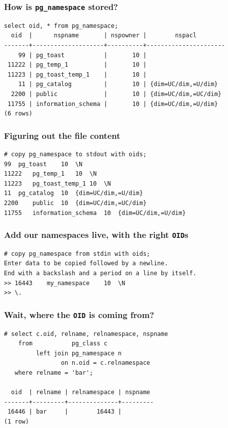 \documentclass{beamer}
\begin{document}
\begin{frame}[fragile]
  \frametitle{How is \texttt{pg\_namespace} stored?}
  
  \begin{verbatim}
select oid, * from pg_namespace;
  oid  |      nspname       | nspowner |        nspacl        
-------+--------------------+----------+----------------------
    99 | pg_toast           |       10 | 
 11222 | pg_temp_1          |       10 | 
 11223 | pg_toast_temp_1    |       10 | 
    11 | pg_catalog         |       10 | {dim=UC/dim,=U/dim}
  2200 | public             |       10 | {dim=UC/dim,=UC/dim}
 11755 | information_schema |       10 | {dim=UC/dim,=U/dim}
(6 rows)
  \end{verbatim}
\end{frame}

\begin{frame}[fragile=singleslide]
  \frametitle{Figuring out the file content}
  
  \begin{verbatim}
# copy pg_namespace to stdout with oids;
99	pg_toast	10	\N
11222	pg_temp_1	10	\N
11223	pg_toast_temp_1	10	\N
11	pg_catalog	10	{dim=UC/dim,=U/dim}
2200	public	10	{dim=UC/dim,=UC/dim}
11755	information_schema	10	{dim=UC/dim,=U/dim}
  \end{verbatim}
\end{frame}

\begin{frame}[fragile=singleslide]
  \frametitle{Add our namespaces live, with the right \texttt{OID}s}
  
  \begin{verbatim}
# copy pg_namespace from stdin with oids;
Enter data to be copied followed by a newline.
End with a backslash and a period on a line by itself.
>> 16443	my_namespace	10	\N
>> \.
  \end{verbatim}
\end{frame}

\begin{frame}[fragile]
  \frametitle{Wait, where the \texttt{OID} is coming from?}
  
  \begin{verbatim}
# select c.oid, relname, relnamespace, nspname
    from           pg_class c
         left join pg_namespace n
                on n.oid = c.relnamespace
   where relname = 'bar';

  oid  | relname | relnamespace | nspname 
-------+---------+--------------+---------
 16446 | bar     |        16443 | 
(1 row)
  \end{verbatim}
\end{frame}
\end{document}
